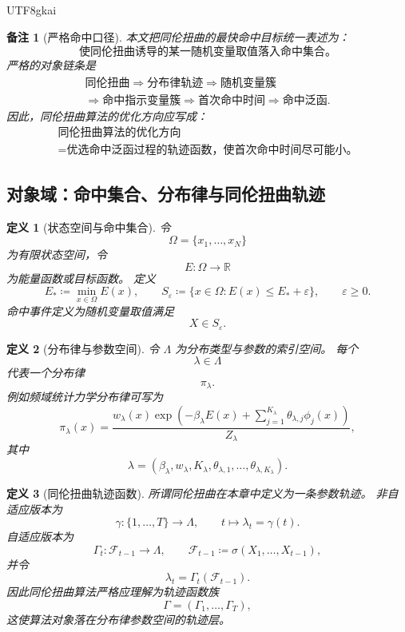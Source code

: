 \documentclass[12pt]{article}
\newtheorem{definition}{定义}[section]
\newtheorem{remark}{备注}[section]
\newcommand{\RR}{\mathbb{R}}
\newcommand{\DefEq}{\coloneqq}
\begin{document}
\begin{CJK*}{UTF8}{gkai}
\begin{remark}[严格命中口径]
本文把同伦扭曲的最快命中目标统一表述为：
\[
  \boxed{
  \text{使同伦扭曲诱导的某一随机变量取值落入命中集合。}
  }
\]
严格的对象链条是
\[
  \boxed{
  \begin{gathered}
  \text{同伦扭曲}
  \Longrightarrow
  \text{分布律轨迹}
  \Longrightarrow
  \text{随机变量簇}\\
  \Longrightarrow
  \text{命中指示变量簇}
  \Longrightarrow
  \text{首次命中时间}
  \Longrightarrow
  \text{命中泛函}.
  \end{gathered}
  }
\]
因此，同伦扭曲算法的优化方向应写成：
\[
  \boxed{
  \begin{gathered}
  \text{同伦扭曲算法的优化方向}\\
  =
  \text{优选命中泛函过程的轨迹函数，使首次命中时间尽可能小。}
  \end{gathered}
  }
\]
\end{remark}

\subsection{对象域：命中集合、分布律与同伦扭曲轨迹}
\label{subsec:tex55-homtwist-objects}

\begin{definition}[状态空间与命中集合]
\label{def:tex55-homtwist-state-hitset}
令
\[
  \Omega=\{x_1,\ldots,x_N\}
\]
为有限状态空间，令
\[
  E:\Omega\to\RR
\]
为能量函数或目标函数。
定义
\[
  E_*\DefEq\min_{x\in\Omega}E(x),
  \qquad
  S_\varepsilon
  \DefEq
  \{x\in\Omega:E(x)\le E_*+\varepsilon\},
  \qquad
  \varepsilon\ge0.
\]
命中事件定义为随机变量取值满足
\[
  X\in S_\varepsilon.
\]
\end{definition}

\begin{definition}[分布律与参数空间]
\label{def:tex55-homtwist-law-space}
令 \(\Lambda\) 为分布类型与参数的索引空间。
每个
\[
  \lambda\in\Lambda
\]
代表一个分布律
\[
  \pi_\lambda.
\]
例如频域统计力学分布律可写为
\[
  \pi_\lambda(x)
  =
  \frac{
  w_\lambda(x)
  \exp\left(
  -\beta_\lambda E(x)
  +
  \sum_{j=1}^{K_\lambda}\theta_{\lambda,j}\phi_j(x)
  \right)
  }{
  Z_\lambda
  },
\]
其中
\[
  \lambda
  =
  (\beta_\lambda,w_\lambda,K_\lambda,
  \theta_{\lambda,1},\ldots,\theta_{\lambda,K_\lambda}).
\]
\end{definition}

\begin{definition}[同伦扭曲轨迹函数]
\label{def:tex55-homtwist-trajectory}
所谓同伦扭曲在本章中定义为一条参数轨迹。
非自适应版本为
\[
  \gamma:\{1,\ldots,T\}\to\Lambda,
  \qquad
  t\mapsto\lambda_t=\gamma(t).
\]
自适应版本为
\[
  \Gamma_t:\mathcal F_{t-1}\to\Lambda,
  \qquad
  \mathcal F_{t-1}\DefEq\sigma(X_1,\ldots,X_{t-1}),
\]
并令
\[
  \lambda_t=\Gamma_t(\mathcal F_{t-1}).
\]
因此同伦扭曲算法严格应理解为轨迹函数族
\[
  \boxed{
  \Gamma=(\Gamma_1,\ldots,\Gamma_T),
  }
\]
这使算法对象落在分布律参数空间的轨迹层。
\end{definition}


\end{CJK*}
\end{document}

